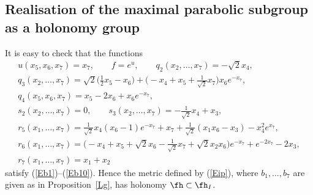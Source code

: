  \subsection{Realisation of the maximal parabolic subgroup as a holonomy group}\label{S3.2}
 It is easy to check that the functions
 \begin{gather*}
 u(x_5,x_6,x_7)=x_7,\qquad f=e^u,\qquad q_2(x_2,\dots,x_7) = -\sqrt 2x_4,\\
 q_3(x_2,\dots,x_7)= \sqrt 2\big(\tfrac12 x_5-x_6\big)+ \big( {-}x_4 +x_5+\tfrac 1{\sqrt 2}x_7 \big)x_6e^{-x_7},\\
 q_4(x_5,x_6,x_7)=x_5-2x_6+x_6e^{-x_7},\\
 s_2(x_2,\dots,x_7) =0,\qquad
 s_3(x_2,\dots,x_7) =-\tfrac1{\sqrt 2}x_4 +x_3 ,\\
 r_5(x_1,\dots,x_7) =\tfrac1{\sqrt 2} x_4(x_6-1)e^{-x_7} +x_7 + \tfrac1{\sqrt 2}(x_1 x_6 -x_3) -x_4^2 e^{x_7} ,\\
 r_6(x_1,\dots,x_7) =\big( {-}x_4+x_5+\sqrt2 x_6 -\tfrac1{\sqrt 2} x_7+\sqrt2 x_2 x_6 \big) e^{-x_7} + e^{-2x_7} -2x_3 ,\\
 r_7(x_1,\dots,x_7) = x_1+x_2
 \end{gather*}
 satisfy (\ref{Eb1})--(\ref{Eb10}). Hence the metric defined by (\ref{Eip}), where $b_1,\dots, b_7$ are given as in Proposition~\ref{Lg}, has holonomy $\fh\subset \fh_I$.

